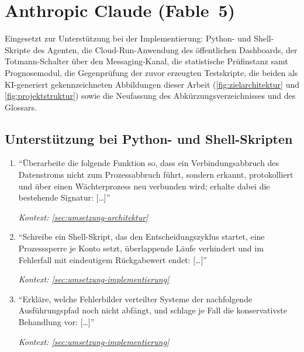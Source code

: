 
\section{Anthropic Claude (Fable~5)}
\label{sec:prompts-fable}

\nocite{claudeFable2026}

Eingesetzt zur Unterstützung bei der Implementierung: Python- und
Shell-Skripte des Agenten, die Cloud-Run-Anwendung des öffentlichen
Dashboards, der Totmann-Schalter über den Messaging-Kanal, die statistische
Prüfinstanz samt Prognosemodul, die Gegenprüfung der zuvor erzeugten
Testskripte, die beiden als KI-generiert gekennzeichneten Abbildungen
dieser Arbeit (\cref{fig:zielarchitektur} und \cref{fig:projektstruktur})
sowie die Neufassung des Abkürzungsverzeichnisses und des Glossars.

\subsection{Unterstützung bei Python- und Shell-Skripten}
\label{sec:prompts-fable-skripte}
\begin{enumerate}
    \item \enquote{Überarbeite die folgende Funktion so, dass ein
            Verbindungsabbruch des Datenstroms nicht zum Prozessabbruch führt,
            sondern erkannt, protokolliert und über einen Wächterprozess
            neu verbunden wird; erhalte dabei die bestehende Signatur:
            [\dots]}
            \par\hfill\textit{Kontext: \cref{sec:umsetzung-architektur}}

    \item \enquote{Schreibe ein Shell-Skript, das den Entscheidungszyklus
            startet, eine Prozesssperre je Konto setzt, überlappende Läufe
            verhindert und im Fehlerfall mit eindeutigem Rückgabewert endet:
            [\dots]}
            \par\hfill\textit{Kontext: \cref{sec:umsetzung-implementierung}}

    \item \enquote{Erkläre, welche Fehlerbilder verteilter Systeme der
            nachfolgende Ausführungspfad noch nicht abfängt, und schlage je
            Fall die konservativste Behandlung vor: [\dots]}
            \par\hfill\textit{Kontext: \cref{sec:umsetzung-implementierung}}
\end{enumerate}

